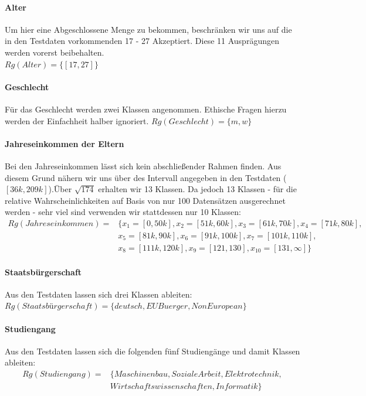 \paragraph{Alter} Um hier eine Abgeschlossene Menge zu bekommen, beschränken wir uns auf die in den Testdaten vorkommenden 17 - 27 Akzeptiert. Diese 11 Ausprägungen werden vorerst beibehalten. \\ $Rg(Alter)=\{[17,27]\}$ 
\paragraph{Geschlecht} Für das Geschlecht werden zwei Klassen angenommen. Ethische Fragen hierzu werden der Einfachheit halber ignoriert. $Rg(Geschlecht) = \{m,w\}$
\paragraph{Jahreseinkommen der Eltern} Bei den Jahreseinkommen lässt sich kein abschließender Rahmen finden. Aus diesem Grund nähern wir uns über des Intervall angegeben in den Testdaten ($[36k,209k]$).Über $\sqrt{174}$ erhalten wir 13 Klassen. Da jedoch 13 Klassen - für die relative Wahrscheinlichkeiten auf Basis von nur 100 Datensätzen ausgerechnet werden - sehr viel sind verwenden wir stattdessen nur 10 Klassen: 
\begin{equation*}
\begin{split}
Rg(Jahreseinkommen)= 	& \{x_1=[0,50k], x_2=[51k,60k], x_3=[61k,70k], x_4=[71k,80k], \\
						& x_5=[81k,90k], x_6=[91k,100k], x_7=[101k,110k], \\
						& x_8=[111k,120k], x_9=[121,130], x_{10}=[131,\infty]\}
\end{split}
\end{equation*}

\paragraph{Staatsbürgerschaft} Aus den Testdaten lassen sich drei Klassen ableiten: \\ 
$Rg(Staatsbürgerschaft) = \{deutsch, EU Buerger, Non European\}$
\paragraph{Studiengang} Aus den Testdaten lassen sich die folgenden fünf Studiengänge und damit Klassen ableiten: \\
\begin{equation*}
\begin{split}
	Rg(Studiengang) = 	& \{Maschinenbau, Soziale Arbeit, Elektrotechnik, \\
						& Wirtschaftswissenschaften,  Informatik\}
\end{split}
\end{equation*}
